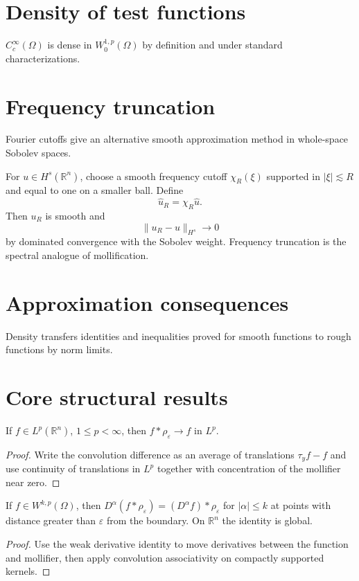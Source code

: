 \section{Density of test functions}
$C_c^\infty(\Omega)$ is dense in $W_0^{1,p}(\Omega)$ by definition and under standard characterizations.

\section{Frequency truncation}
Fourier cutoffs give an alternative smooth approximation method in whole-space Sobolev spaces.


\begin{example}\label{ex:iii22-expand-03}
For \(u\in H^s(\mathbb R^n)\), choose a smooth frequency cutoff
\(\chi_R(\xi)\) supported in \(|\xi|\lesssim R\) and equal to one on a smaller
ball. Define
\[
\widehat u_R=\chi_R\widehat u.
\]
Then \(u_R\) is smooth and
\[
\|u_R-u\|_{H^s}\to0
\]
by dominated convergence with the Sobolev weight. Frequency truncation is the
spectral analogue of mollification.
\end{example}
\section{Approximation consequences}
Density transfers identities and inequalities proved for smooth functions to rough functions by norm limits.

\section{Core structural results}

\begin{theorem}\label{thm:iii22-01}
If $f\in L^p(\mathbb R^n)$, $1\le p<\infty$, then $f*\rho_\varepsilon\to f$ in $L^p$.
\begin{proof}
Write the convolution difference as an average of translations $\tau_yf-f$ and use continuity of translations in $L^p$ together with concentration of the mollifier near zero.
\end{proof}
\end{theorem}

\begin{theorem}\label{thm:iii22-02}
If $f\in W^{k,p}(\Omega)$, then $D^\alpha(f*\rho_\varepsilon)=(D^\alpha f)*\rho_\varepsilon$ for $|\alpha|\le k$ at points with distance greater than $\varepsilon$ from the boundary. On $\mathbb R^n$ the identity is global.
\begin{proof}
Use the weak derivative identity to move derivatives between the function and mollifier, then apply convolution associativity on compactly supported kernels.
\end{proof}
\end{theorem}

